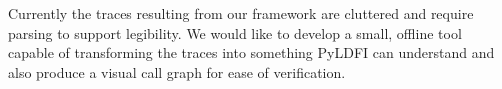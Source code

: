 Currently the traces resulting from our framework are cluttered and require parsing to support legibility. We would like to develop a small, offline tool capable of transforming the traces into something PyLDFI can understand and also produce a visual call graph for ease of verification. 

